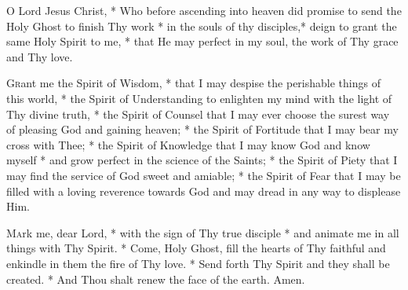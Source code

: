 {\centering\Large{\MakeUppercase{}}\par}

\begin{enpars}
\lettrine{O}{} Lord Jesus Christ, * Who before ascending into heaven did promise to send the Holy Ghost to finish Thy work * in the souls of thy disciples,* deign to grant the same Holy Spirit to me, * that He may perfect in my soul, the work of Thy grace and Thy love.

\lettrine{G}{r}ant me the Spirit of Wisdom, * that I may despise the perishable things of this world, * the Spirit of Understanding to enlighten my mind with the light of Thy divine truth, * the Spirit of Counsel that I may ever choose the surest way of pleasing God and gaining heaven; * the Spirit of Fortitude that I may bear my cross with Thee; * the Spirit of Knowledge that I may know God and know myself * and grow perfect in the science of the Saints; * the Spirit of Piety that I may find the service of God sweet and amiable; * the Spirit of Fear that I may be filled with a loving reverence towards God and may dread in any way to displease Him.


%
%

\lettrine{M}{a}rk me, dear Lord, * with the sign of Thy true disciple * and animate me in all things with Thy Spirit. * Come, Holy Ghost, 
fill the hearts of Thy faithful and enkindle in them the fire of Thy love. * Send forth Thy Spirit and they shall be created. * And Thou shalt renew the face of the earth. Amen.

\end{enpars}